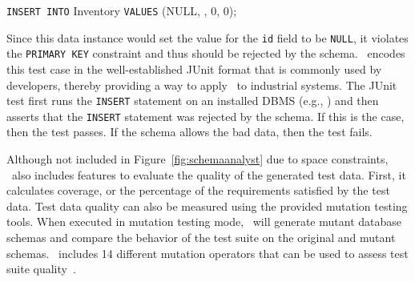 
\vspace*{.1in}
\texttt{INSERT INTO} Inventory \texttt{VALUES} (NULL, \textquotesingle\textquotesingle, 0, 0);
\vspace*{.1in}


Since this data instance would set the value for the \texttt{id} field to be \texttt{NULL}, it violates the
\texttt{PRIMARY KEY} constraint and thus should be rejected by the schema. \sa~encodes this test case in the
well-established JUnit format that is commonly used by developers, thereby providing a way to apply \sa~to industrial
systems.  The JUnit test first runs the \texttt{INSERT} statement on an installed DBMS (e.g., \sqlite) and then asserts
that the \texttt{INSERT} statement was rejected by the schema. If this is the case, then the test passes.  If the schema
allows the bad data, then the test fails.


Although not included in Figure~\ref{fig:schemaanalyst} due to space constraints, \sa~also includes features to evaluate
the quality of the generated test data. First, it calculates coverage, or the percentage of the requirements satisfied
by the test data.  Test data quality can also be measured using the provided mutation testing tools. When executed in
mutation testing mode, \sa~will generate mutant database schemas and compare the behavior of the test suite on the
original and mutant schemas. \sa~includes 14 different mutation operators that can be used to assess test suite
quality~\cite{wright2015mutation}.



